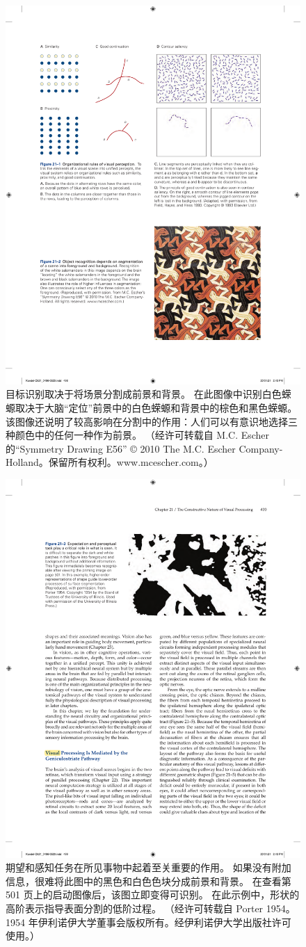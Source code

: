 \begin{figure}[htbp]
	\centering
	\includegraphics[width=0.5\linewidth]{chap21/fig_21_2}
	\caption{目标识别取决于将场景分割成前景和背景。 
		在此图像中识别白色蝾螈取决于大脑“定位”前景中的白色蝾螈和背景中的棕色和黑色蝾螈。 
		该图像还说明了较高影响在分割中的作用：人们可以有意识地选择三种颜色中的任何一种作为前景。 （经许可转载自 M.C. Escher 的“Symmetry Drawing E56” © 2010 The M.C. Escher Company- Holland。保留所有权利。www.mcescher.com。）}
	\label{fig:21_2}
\end{figure}

\begin{figure}[htbp]
	\centering
	\includegraphics[width=0.5\linewidth]{chap21/fig_21_3}
	\caption{期望和感知任务在所见事物中起着至关重要的作用。 
		如果没有附加信息，很难将此图中的黑色和白色色块分成前景和背景。 
		在查看第 501 页上的启动图像后，该图立即变得可识别。
		在此示例中，形状的高阶表示指导表面分割的低阶过程。 （经许可转载自 Porter 1954。1954 年伊利诺伊大学董事会版权所有。经伊利诺伊大学出版社许可使用。）}
	\label{fig:21_3}
\end{figure}

